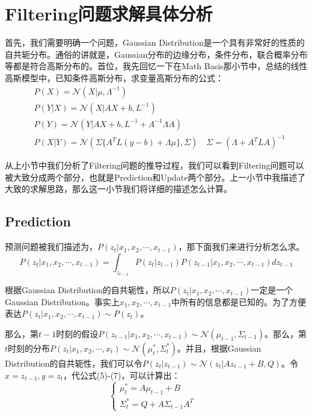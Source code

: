 \documentclass[a4paper]{article}
\begin{document}
\section{Filtering问题求解具体分析}
首先，我们需要明确一个问题，Gaussian Distribution是一个具有非常好的性质的{\color{red}自共轭分布}。通俗的讲就是，Gaussian分布的边缘分布，条件分布，联合概率分布等都是符合高斯分布的。首位，我先回忆一下在Math Basis那小节中，总结的线性高斯模型中，已知条件高斯分布，求变量高斯分布的公式：
\begin{align}
    & P(X) = \mathcal{N}(X|\mu,\Lambda^{-1}) \\
    & P(Y|X) = \mathcal{N}(X|AX+b,L^{-1}) \\
    & P(Y) = \mathcal{N}(Y|AX+b,L^{-1}+A^{-1}\Lambda A) \\
    & P(X|Y) = \mathcal{N}(\Sigma\{ A^TL(y-b)+\Lambda\mu \}, \Sigma) \quad \Sigma = (\Lambda + A^TLA)^{-1}
\end{align}

从上小节中我们分析了Filtering问题的推导过程，我们可以看到Filtering问题可以被大致分成两个部分，也就是Prediction和Update两个部分。上一小节中我描述了大致的求解思路，那么这一小节我们将详细的描述怎么计算。

\subsection{Prediction}
预测问题被我们描述为，$P(z_t|x_1,x_2,\cdots,x_{t-1})$，那下面我们来进行分析怎么求。
\begin{equation}
    P(z_t|x_1,x_2,\cdots,x_{t-1}) = \int_{z_{t-1}} P(z_t|z_{t-1}) P(z_{t-1}|x_1,x_2,\cdots,x_{t-1}) dz_{t-1}
\end{equation}

根据Gaussian Distribution的自共轭性，所以$P(z_t|x_1,x_2,\cdots,x_{t-1})$一定是一个Gaussian Distribution。事实上$x_1,x_2,\cdots,x_{t-1}$中所有的信息都是已知的。为了方便表达$P(z_t|x_1,x_2,\cdots,x_{t-1}) \sim P(z_t)$。

那么，第$t-1$时刻的假设$P(z_{t-1}|x_1,x_2,\cdots,x_{t-1}) \sim \mathcal{N}(\mu_{t-1},\Sigma_{t-1})$。那么，第$t$时刻的分布$P(z_{t}|x_1,x_2,\cdots,x_{t}) \sim \mathcal{N}(\mu_{t}^\ast,\Sigma_{t}^\ast)$。并且，根据Gaussian Distribution的自共轭性，我们可以令$P(z_t|z_{t-1})\sim \mathcal{N}(z_t|Az_{t-1}+B,Q)$。令$x=z_{t-1},y=z_{t}$，代公式(5)-(7)，可以计算出：
\begin{equation}
    \left\{
    \begin{array}{ll}
        \mu_{t}^\ast = A\mu_{t-1}+B & \\
        \Sigma_{t}^\ast = Q+A\Sigma_{t-1}A^T
    \end{array}
    \right.
\end{equation}
\end{document}
